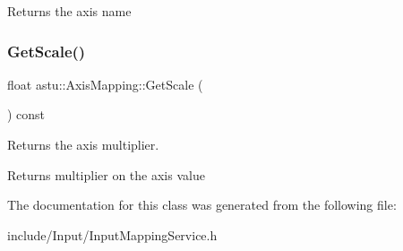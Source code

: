 \begin{DoxyReturn}{Returns}
the axis name 
\end{DoxyReturn}
\mbox{\label{classastu_1_1AxisMapping_ad06f6315529e72132e27c97b6ff15378}} 
\subsubsection{\texorpdfstring{Get\+Scale()}{GetScale()}}
{\footnotesize\ttfamily float astu\+::\+Axis\+Mapping\+::\+Get\+Scale (\begin{DoxyParamCaption}{ }\end{DoxyParamCaption}) const}

Returns the axis multiplier.

\begin{DoxyReturn}{Returns}
multiplier on the axis value 
\end{DoxyReturn}


The documentation for this class was generated from the following file\+:\begin{DoxyCompactItemize}
\item 
include/\+Input/Input\+Mapping\+Service.\+h\end{DoxyCompactItemize}

